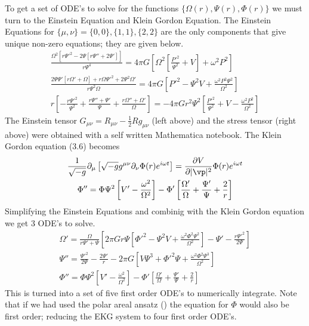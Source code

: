 To get a set of ODE's to solve for the functions $\{\Omega(r), \Psi(r),\Phi(r)\}$ we must turn to the Einstein Equation and Klein Gordon Equation. The Einstein Equations for $\{\mu,\nu\}=\{0,0\},\{1,1\},\{2,2\}$ are the only components that give unique non-zero equations; they are given below.
\begin{gather}
\frac{\Omega ^2 \left[r \Psi '^2-2 \Psi  \left[r \Psi ''+2 \Psi '\right]\right]}{r \Psi ^4} = 4\pi G \left[\Omega ^2 \left[\frac{P'^2}{\Psi ^2}+V\right]+\omega ^2 P^2\right]\\
\frac{2 \Psi  \Psi ' \left[r \Omega '+\Omega \right]+r \Omega  \Psi '^2+2 \Psi ^2 \Omega
   '}{r \Psi ^2 \Omega } = 4\pi G \left[P'^2-\Psi ^2 V+\frac{\omega ^2 P^2 \Psi ^2}{\Omega
   ^2}\right]\\
   r \left[-\frac{r \Psi '^2}{\Psi ^2}+\frac{r \Psi ''+\Psi '}{\Psi }+\frac{r \Omega ''+\Omega
   '}{\Omega }\right] = -4\pi G r^2 \Psi ^2 \left[\frac{P'^2}{\Psi ^2}+V-\frac{\omega ^2 P^2}{\Omega
   ^2}\right]
   \end{gather}
  The Einstein tensor $G_{\mu\nu} = R_{\mu\nu}-\frac{1}{2}R g_{\mu\nu}$ (left above) and the stress tensor (right above) were obtained with a self written Mathematica notebook. The Klein Gordon equation (3.6) becomes
  \begin{gather*} \frac{1}{\sqrt{-g}}\partial_\mu \left[ \sqrt{-g}g^{\mu\nu}\partial_\nu \Phi(r)e^{i\omega t}\right] = \frac{\partial V}{\partial |\vp|^2} \Phi(r)e^{i\omega t} \\
  \Phi'' = \Phi\Psi^2\left[V'-\frac{\omega^2}{\Omega^2}\right] - \Phi'\left[\frac{\Omega'}{\Omega} +\frac{\Psi'}{\Psi}+\frac{2}{r} \right]\end{gather*}
Simplifying the Einstein Equations and combinig with the Klein Gordon equation we get 3 ODE's to solve.
\begin{gather}\Omega '=\frac{\Omega}{r\Psi'+\Psi}\left[2 \pi  G r \Psi \left[\Phi'^2 -\Psi^2 
   V+\frac{\omega ^2 \Phi^2 \Psi^2}{\Omega^2} \right]  -\Psi '-\frac{r \Psi '^2}{2 \Psi} \right]
\\{ \Psi'' = \frac{\Psi'^2}{2\Psi} - \frac{2\Psi'}{r}-2\pi G \left[V \Psi^3 + \Phi'^2\Psi+ \frac{ \omega^2\Phi^2\Psi^3}{\Omega^2}\right] }
\\ \Phi'' = \Phi\Psi^2\left[V'-\frac{\omega^2}{\Omega^2}\right] - \Phi'\left[\frac{\Omega'}{\Omega} +\frac{\Psi'}{\Psi}+\frac{2}{r} \right]\end{gather}
This is turned into a set of five first order ODE's to numerically integrate. Note that if we had used the polar areal ansatz () the equation for $\Phi$ would also be first order; reducing the EKG system to four first order ODE's.


